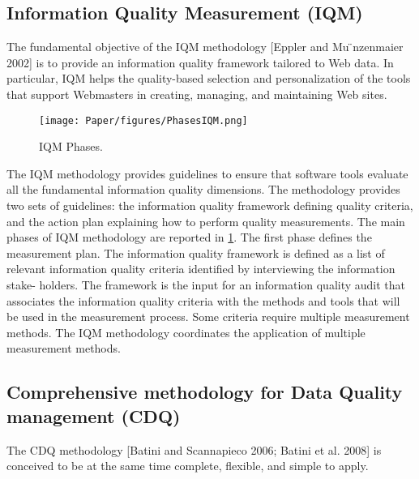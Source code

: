 \documentclass[pdftex,english,oribibl]{llncs}
\begin{document}
\subsection{Information Quality Measurement (IQM)}
The fundamental objective of the IQM methodology [Eppler and Mu ̈nzenmaier 2002] is to provide an information quality framework tailored to Web data.
In particular, IQM helps the quality-based selection and personalization of the tools that support Webmasters in creating, managing, and maintaining Web sites.
\begin{figure}
    \centering
    \texttt{[image: Paper/figures/PhasesIQM.png]}
    \caption{IQM Phases.}
    \label{fig:PhasesIQM}
 \end{figure}

The IQM methodology provides guidelines to ensure that software tools evaluate all the fundamental information quality dimensions.
The methodology provides two sets of guidelines: the information quality framework defining quality criteria, and the action plan explaining how to perform quality measurements.
The main phases of IQM methodology are reported in \ref{fig:PhasesIQM}. The first phase defines the measurement plan.
The information quality framework is defined as a list of relevant information quality criteria identified by interviewing the information stake- holders.
The framework is the input for an information quality audit that associates the information quality criteria with the methods and tools that will be used in the measurement process.
Some criteria require multiple measurement methods. The IQM methodology coordinates the application of multiple measurement methods.

\subsection{Comprehensive methodology for Data Quality management (CDQ)}

The CDQ methodology [Batini and Scannapieco 2006; Batini et al. 2008] is conceived to be at the same time complete, flexible, and simple to apply.

\begin{comment}
Completeness is achieved by considering existing techniques and tools and integrating them in a framework that can work in both intra- and inter-organizational contexts, and can be applied to all types of data, structured, semistructured and unstructured.
The methodology is flexible since it supports the user in the selection of the most suitable techniques and tools within each phase and in any context.
Finally, CDQ is simple since it is organized in phases and each phase is characterized by a specific goal and set of techniques to apply.

In fact, the other methodologies implicitly assume that contextual knowledge has been previously gathered and modelled.
\end{comment}
\end{document}
